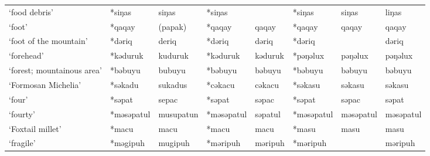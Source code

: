 \begin{landscape}
\begin{longtable}[c]{@{}p{3cm}<{\raggedright}p{2.75cm}<{\raggedright}p{2.75cm}<{\raggedright}p{2.75cm}<{\raggedright}p{2.75cm}<{\raggedright}p{2.75cm}<{\raggedright}p{2.75cm}<{\raggedright}p{2.75cm}<{\raggedright}@{}}
`food debris'                                        & *siŋas             & siŋas                          & *siŋas             &                            & *siŋas           & siŋas                    & liŋas                             \\
`foot'                                               & *qaqay             & (papak)                        & *qaqay             & qaqay                      & *qaqay           & qaqay                    & qaqay                             \\
`foot of the mountain'                               & *dəriq             & deriq                          & *dəriq             & dəriq                      & *dəriq           &                          & dəriq                             \\
`forehead'                                           & *kəduruk           & kuduruk                        & *kəduruk           & kəduruk                    & *pəŋəlux         & pəŋəlux                  & pəŋəlux                           \\
`forest; mountainous area'                           & *bəbuyu            & bubuyu                         & *bəbuyu            & bəbuyu                     & *bəbuyu          & bəbuyu                   & bəbuyu                            \\
`Formosan Michelia'                                  & *səkadu            & sukadus                        & *cəkacu            & cəkacu                     & *səkasu          & səkasu                   & səkasu                            \\
`four'                                               & *səpat             & sepac                          & *səpat             & səpac                      & *səpat           & səpac                    & səpat                             \\
`fourty'                                             & *məsəpatul         & musupatun                      & *məsəpatul         & səpatul                    & *məsəpatul       & məsəpatul                & məsəpatul                         \\
`Foxtail millet'                                     & *macu              & macu                           & *macu              & macu                       & *masu            & masu                     & masu                              \\
`fragile'                                            & *məgipuh           & mugipuh                        & *məripuh           & məripuh                    & *məripuh         &                          & məripuh                           \\

\end{longtable}
\end{landscape}
